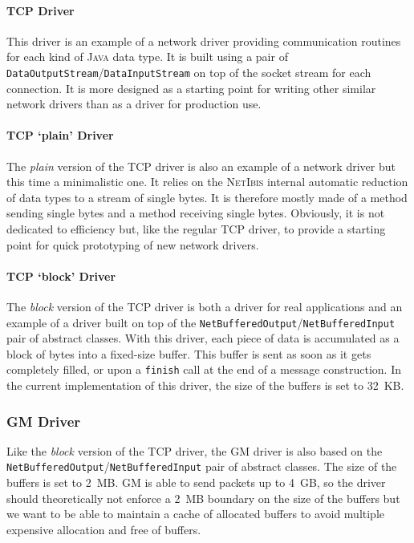 \documentclass[11pt]{book}
\def\NetIbis{\textsc{NetIbis}\xspace}
\begin{document}
\paragraph{TCP Driver}
\label{sec:tcp-driver}

This driver is an example of a network driver providing communication
routines for each kind of \textsc{Java} data type. It is built using a
pair of \texttt{DataOutputStream}/\texttt{DataInputStream} on top of
the socket stream for each connection. It is more designed as a
starting point for writing other similar network drivers than as a
driver for production use.

\paragraph{TCP `plain' Driver}
\label{sec:tcp-plain-driver}

The \emph{plain} version of the TCP driver is also an example of a
network driver but this time a minimalistic one. It relies on the
\NetIbis internal automatic reduction of data types to a stream of
single bytes. It is therefore mostly made of a method sending single
bytes and a method receiving single bytes. Obviously, it is not
dedicated to efficiency but, like the regular TCP driver, to provide a
starting point for quick prototyping of new network drivers. 

\paragraph{TCP `block' Driver}
\label{sec:tcp-block-driver}

The \emph{block} version of the TCP driver is both a driver for real
applications and an example of a driver built on top of the
\texttt{NetBufferedOutput}/\texttt{NetBufferedInput} pair of abstract
classes. With this driver, each piece of data is accumulated as a
block of bytes into a fixed-size buffer. This buffer is sent as soon
as it gets completely filled, or upon a \texttt{finish} call at the
end of a message construction. In the current implementation of this
driver, the size of the buffers is set to 32~KB.


%
\subsubsection{GM Driver}
\label{sec:gm-driver}

Like the \emph{block} version of the TCP driver, the GM driver is also
based on the \texttt{NetBufferedOutput}/\texttt{NetBufferedInput} pair
of abstract classes. The size of the buffers is set to 2~MB.
GM is able to send packets up to 4~GB, so the driver should
theoretically not enforce a 2~MB boundary on the size of the buffers
but we want to be able to maintain a cache of allocated buffers to
avoid multiple expensive allocation and free of buffers. 
\end{document}
